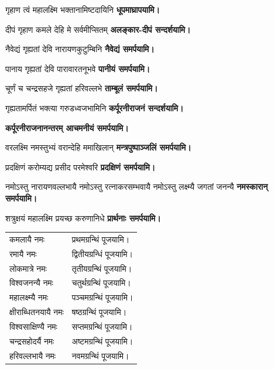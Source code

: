 \begin{center}
{गृहाण त्वं महालक्ष्मि भक्तानामिष्टदायिनि}
\textbf{\devAya{} धूपमाघ्रापयामि।}
\medskip

{दीपं गृहाण कमले देहि मे सर्वमीप्सितम्}
\textbf{\devAya{} अलङ्कार-दीपं सन्दर्शयामि।}
\medskip

{नैवेद्यं गृह्यतां देवि नारायणकुटुम्बिनि}
\textbf{\devAya{} नैवेद्यं समर्पयामि।}
\medskip

{पानाय गृह्यतां देवि पारावारतनूभवे}
\textbf{\devAya{} पानीयं समर्पयामि।}
\medskip

{चूर्णं च चन्द्रसहजे गृह्यतां हरिवल्लभे}
\textbf{\devAya{} ताम्बूलं समर्पयामि।}
\medskip

{गृह्यतामर्पितं भक्त्या गरुडध्वजभामिनि}
\textbf{\devAya{} कर्पूरनीराजनं सन्दर्शयामि।}

\textbf{कर्पूरनीराजनानन्तरम् आचमनीयं समर्पयामि।}
\medskip

{वरलक्ष्मि नमस्तुभ्यं वरान्देहि ममाखिलान्}
\textbf{\devAya{} मन्त्रपुष्पाञ्जलिं समर्पयामि।}
\medskip

{प्रदक्षिणं करोम्यद्य प्रसीद परमेश्वरि}
\textbf{\devAya{} प्रदक्षिणं समर्पयामि।}
\medskip

{नमोऽस्तु नारायणवल्लभायै}
{नमोऽस्तु रत्नाकरसम्भवायै}
{नमोऽस्तु लक्ष्म्यै जगतां जनन्यै}
\textbf{\devAya{} नमस्कारान् समर्पयामि।}
\medskip

{शत्रुक्षयं महालक्ष्मि प्रयच्छ करुणानिधे}
\textbf{\devAya{} प्रार्थनाः समर्पयामि।}
\medskip


\begin{longtable}{l@{—}l}
कमलायै नमः & प्रथमग्रन्थिं पूजयामि।\\
रमायै नमः & द्वितीयग्रन्धिं पूजयामि।\\
लोकमात्रे नमः & तृतीयग्रन्थिं पूजयामि।\\
विश्वजनन्यै नमः & चतुर्थग्रन्थिं पूजयामि।\\
महालक्ष्म्यै नमः & पञ्चमग्रन्थिं पूजयामि।\\
क्षीराब्धितनयायै नमः & षष्ठग्रन्थिं पूजयामि।\\
विश्वसाक्षिण्यै नमः & सप्तमग्रन्थिं पूजयामि।\\
चन्द्रसहोदर्यै नमः & अष्टमग्रन्थिं पूजयामि।\\
हरिवल्लभायै नमः & नवमग्रन्थिं पूजयामि।\\
\end{longtable}


\end{center}
